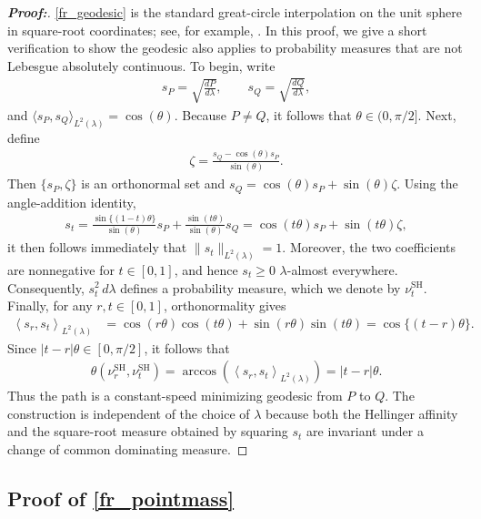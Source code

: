 \documentclass[11pt,twoside]{article}
\theoremstyle{definition}
\theoremstyle{remark}
\begin{document}
\begin{proof}[\textbf{Proof:}] \cref{fr_geodesic} is the standard great-circle interpolation on the unit sphere in square-root coordinates; see, for example, \citet{kurtek2015}. In this proof, we give a short verification to show the geodesic also applies to probability measures that are not Lebesgue absolutely continuous. To begin, write
\begin{align*}
     s_P=\sqrt{\frac{dP}{d\lambda}}, \qquad s_Q=\sqrt{\frac{dQ}{d\lambda}},
\end{align*}
and $\langle s_P,s_Q\rangle_{L^2(\lambda)}=\cos(\theta)$. Because $P\neq Q$, it follows that $\theta\in(0,\pi/2]$. Next, define
\begin{align*}
     \zeta = \frac{s_Q-\cos(\theta)s_P}{\sin(\theta)}.
\end{align*}
Then $\{s_P, \zeta\}$ is an orthonormal set and $s_Q=\cos(\theta)s_P+\sin(\theta)\zeta$. Using the angle-addition identity,
\begin{align*}
    s_t = \frac{\sin\{(1-t)\theta\}}{\sin(\theta)}s_P + \frac{\sin(t\theta)}{\sin(\theta)}s_Q = \cos(t\theta)s_P+\sin(t\theta) \zeta,
\end{align*}
it then follows immediately that $\|s_t\|_{L^2(\lambda)}=1$. Moreover, the two coefficients are nonnegative for $t\in[0,1]$, and hence $s_t \geq 0$ $\lambda$-almost everywhere. Consequently, $s_t^2\,d\lambda$ defines a probability measure, which we denote by $\nu_t^{\mathrm{SH}}$. Finally, for any $r,t\in[0,1]$, orthonormality gives
\begin{align*}
    \left\langle s_r,s_t\right\rangle_{L^2(\lambda)} &= \cos(r\theta)\cos(t\theta) + \sin(r\theta)\sin(t\theta) = \cos\{(t-r)\theta\}.
\end{align*}
Since $|t-r|\theta\in[0,\pi/2]$, it follows that
\begin{align*}
     \theta\!\left(\nu_r^{\mathrm{SH}}, \nu_t^{\mathrm{SH}} \right) = \arccos\!\left( \left\langle s_r,s_t\right\rangle_{L^2(\lambda)} \right) = |t-r|\theta.
\end{align*}
Thus the path is a constant-speed minimizing geodesic from $P$ to $Q$. The construction is independent of the choice of $\lambda$ because both the Hellinger affinity and the square-root measure obtained by squaring $s_t$ are invariant under a change of common dominating measure.
    
\end{proof}

\subsection{Proof of \cref{fr_pointmass}} \label{fr_pointmass_proof}
\end{document}
